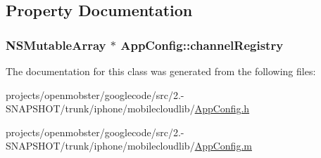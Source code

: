 \subsection{\-Property \-Documentation}
\hypertarget{interface_app_config_a4c4c348fbeaa9b1c969c9e54664718f2}{
\subsubsection[{channel\-Registry}]{\setlength{\rightskip}{0pt plus 5cm}\-N\-S\-Mutable\-Array $\ast$ \-App\-Config\-::channel\-Registry}}
\label{interface_app_config_a4c4c348fbeaa9b1c969c9e54664718f2}


\-The documentation for this class was generated from the following files\-:\begin{DoxyCompactItemize}
\item 
projects/openmobster/googlecode/src/2.-\/\-S\-N\-A\-P\-S\-H\-O\-T/trunk/iphone/mobilecloudlib/\hyperlink{_app_config_8h}{\-App\-Config.\-h}\item 
projects/openmobster/googlecode/src/2.-\/\-S\-N\-A\-P\-S\-H\-O\-T/trunk/iphone/mobilecloudlib/\hyperlink{_app_config_8m}{\-App\-Config.\-m}\end{DoxyCompactItemize}
